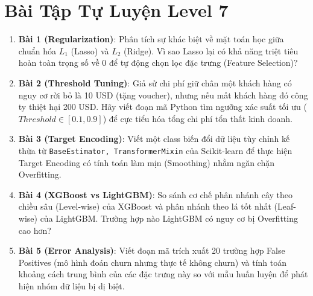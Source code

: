 \section{Bài Tập Tự Luyện Level 7}

\begin{baitapbox}
\begin{enumerate}
    \item \textbf{Bài 1 (Regularization)}: Phân tích sự khác biệt về mặt toán học giữa chuẩn hóa $L_1$ (Lasso) và $L_2$ (Ridge). Vì sao Lasso lại có khả năng triệt tiêu hoàn toàn trọng số về 0 để tự động chọn lọc đặc trưng (Feature Selection)?
    \item \textbf{Bài 2 (Threshold Tuning)}: Giả sử chi phí giữ chân một khách hàng có nguy cơ rời bỏ là 10 USD (tặng voucher), nhưng nếu mất khách hàng đó công ty thiệt hại 200 USD. Hãy viết đoạn mã Python tìm ngưỡng xác suất tối ưu ($Threshold \in [0.1, 0.9]$) để cực tiểu hóa tổng chi phí tổn thất kinh doanh.
    \item \textbf{Bài 3 (Target Encoding)}: Viết một class biến đổi dữ liệu tùy chỉnh kế thừa từ \texttt{BaseEstimator, TransformerMixin} của Scikit-learn để thực hiện Target Encoding có tính toán làm mịn (Smoothing) nhằm ngăn chặn Overfitting.
    \item \textbf{Bài 4 (XGBoost vs LightGBM)}: So sánh cơ chế phân nhánh cây theo chiều sâu (Level-wise) của XGBoost và phân nhánh theo lá tốt nhất (Leaf-wise) của LightGBM. Trường hợp nào LightGBM có nguy cơ bị Overfitting cao hơn?
    \item \textbf{Bài 5 (Error Analysis)}: Viết đoạn mã trích xuất 20 trường hợp False Positives (mô hình đoán churn nhưng thực tế không churn) và tính toán khoảng cách trung bình của các đặc trưng này so với mẫu huấn luyện để phát hiện nhóm dữ liệu bị dị biệt.
\end{enumerate}
\end{baitapbox}

